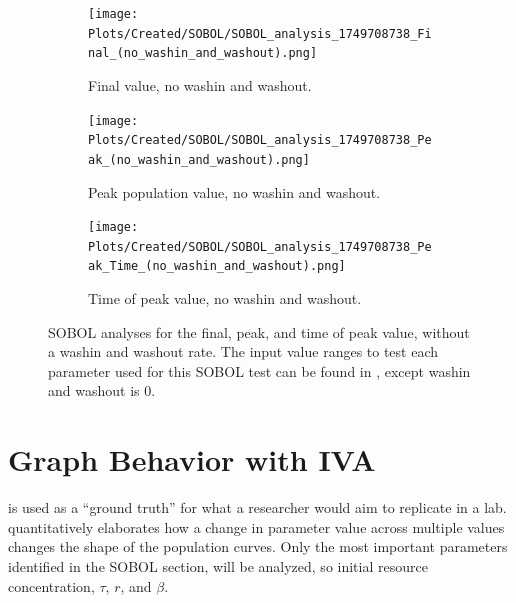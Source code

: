 \begin{figure}[ht!]
    \centering
    \begin{subfigure}{0.32\linewidth}
        \centering
        \captionsetup{width=1\linewidth}
        \texttt{[image: Plots/Created/SOBOL/SOBOL\_analysis\_1749708738\_Final\_(no\_washin\_and\_washout).png]}
        \caption{
            Final value, no washin and washout. 
        }
        \label{fig:created:SOBOL_final_no_wi_wo}
    \end{subfigure}
    \hfill
    \begin{subfigure}{0.32\linewidth}
        \centering
        \captionsetup{width=1\linewidth}
        \texttt{[image: Plots/Created/SOBOL/SOBOL\_analysis\_1749708738\_Peak\_(no\_washin\_and\_washout).png]}
        \caption{
            Peak population value, no washin and washout. 
        }
        \label{fig:created:SOBOL_peak_no_wi_wo}
    \end{subfigure}
    \hfill
    \begin{subfigure}{0.32\linewidth}
        \centering
        \captionsetup{width=1\linewidth}
        \texttt{[image: Plots/Created/SOBOL/SOBOL\_analysis\_1749708738\_Peak\_Time\_(no\_washin\_and\_washout).png]}
        \caption{
            Time of peak value, no washin and washout. 
        }
        \label{fig:created:SOBOL_peak_time_no_wi_wo}
    \end{subfigure}
    \caption{
        SOBOL analyses for the final, peak, and time of peak value, without a washin and washout rate.
        The input value ranges to test each parameter used for this SOBOL test can be found in , except washin and washout is 0. 
    }
    \label{fig:created:SOBOL_no_wi_wo}
\end{figure}

\section{Graph Behavior with IVA}
 is used as a “ground truth” for what a researcher would aim to replicate in a lab.  
 quantitatively elaborates how a change in parameter value across multiple values changes the shape of the population curves. 
Only the most important parameters identified in the SOBOL section, will be analyzed, so initial resource concentration, $\tau$, $r$, and $\beta$. 

